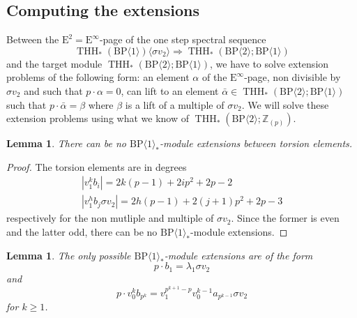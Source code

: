 \documentclass[11pt]{amsart}
\newcommand{\mr}[1]{\mathrm{#1}}
\newcommand{\Z}{\mathbb{Z}}
\newcommand{\BP}{\mr{BP}}
\DeclareMathOperator{\THH}{THH}
\newtheorem{lemma}[equation]{Lemma}
\theoremstyle{definition}
\numberwithin{equation}{section}
\numberwithin{figure}{section}
\begin{document}
\subsection{Computing the extensions}\label{sec:extensions}

Between the $\mathrm{E}^2= \mathrm{E}^\infty$-page of the one step spectral sequence
\[
  \THH_*(\BP \langle 1 \rangle)\langle \sigma v_2 \rangle \Rightarrow \THH_*(\BP \langle 2 \rangle ; \BP \langle 1 \rangle)
\]
and the target module $\THH_*(\BP \langle 2 \rangle ; \BP \langle 1 \rangle)$, we have to solve extension problems of the following form: an element $\alpha$ of the $\mathrm{E}^\infty$-page, non divisible by $\sigma v_2$ and such that $p \cdot \alpha = 0$, can lift to an element $\bar{\alpha} \in \THH_*(\BP \langle 2 \rangle ; \BP \langle 1 \rangle)$ such that $p \cdot \bar{\alpha} = \beta$ where $\beta$ is a lift of a multiple of $\sigma v_2$. We will solve these extension problems using what we know of $\THH_*(\BP \langle 2 \rangle ; \Z_{(p)})$. 

\begin{lemma}\label{lem432}
  There can be no $\mathrm{BP}\langle 1\rangle_*$-module extensions between torsion elements.
\end{lemma}

\begin{proof}
  The torsion elements are in degrees
  \[
    \begin{gathered}
      |v_1^k b_i | = 2k(p-1) + 2i p^2 + 2p - 2 \\
      |v_1^h b_j \sigma v_2| = 2h(p-1) + 2(j+1)p^2 + 2p - 3
    \end{gathered}
  \]
  respectively for the non mutliple and multiple of $\sigma v_2$. Since the former is even and the latter odd, there can be no $\mathrm{BP}\langle 1\rangle_*$-module extensions.
\end{proof}


\begin{lemma} \label{lem:onlyextensions}
  The only possible $\mathrm{BP}\langle 1\rangle_*$-module extensions %
  are of the form
  \[
    p \cdot b_1 = \lambda_1 \sigma v_2
  \]
  and
  \[
    p \cdot v_0^k b_{p^k} = v_1^{p^{k+1} - p}v_0^{k-1} a_{p^{k-1}} \sigma v_2
  \]
  for $k \geq 1$.
\end{lemma}
\end{document}
